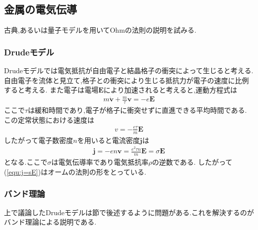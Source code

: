\subsection{金属の電気伝導}
古典,あるいは量子モデルを用いてOhmの法則の説明を試みる.
\subsubsection{Drudeモデル}
Drudeモデルでは電気抵抗が自由電子と結晶格子の衝突によって生じると考える.
自由電子を流体と見立て,格子との衝突により生じる抵抗力が電子の速度に比例すると考える.
また電子は電場$\bm E$により加速されると考えると,運動方程式は
\begin{align}
  m\dot{\bm v}+\frac{m}{\tau}{\bm v}=-e{\bm E}
\end{align}
ここで$\tau$は緩和時間であり,電子が格子に衝突せずに直進できる平均時間である.
この定常状態における速度は
\begin{align}
  v=-\frac{e\tau}{m}{\bm E}
\end{align}
したがって電子数密度$n$を用いると電流密度$\bm j$は
\begin{align}
  \label{equ:j=sE}
  {\bm j}=-en{\bm v}=\frac{e^2\tau n}{m}{\bm E}=\sigma{\bm E}
\end{align}
となる.ここで$\sigma$は電気伝導率であり電気抵抗率$\rho$の逆数である.
したがって(\ref{equ:j=sE})はオームの法則の形をとっている.
\subsubsection{バンド理論}
上で議論したDrudeモデルは節で後述するように問題がある.これを解決するのがバンド理論による説明である.

